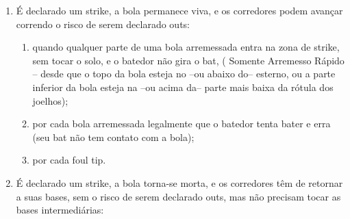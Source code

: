 \begin{multicols}{2}
\begin{enumerate}[label=\alph*)]
		\begin{enumerate}[label=\roman*.]
			\item por cada bola arremessada ilegalmente que n\~ao \'e batida pelo batedor; 
			
			\item quando o t\'ecnico prefere n\~ao aceitar o resultado da jogada depois que a bola \'e batida; ou 
			\item por cada arremesso de aquecimento excedente. 
		\end{enumerate}
		
		\item  \'E declarado um \gls{strike}, a bola permanece viva, e os corredores podem avan\c{c}ar correndo o risco de serem declarado \gls{out}s: 
		
		\begin{enumerate}[label=\roman*.]
			\item quando qualquer parte de uma bola arremessada entra na zona de \gls{strike}, sem tocar o solo, e o batedor n\~ao gira o \gls{bat}, (
			{\color{red!80}Somente Arremesso R\'apido -- desde que o topo da bola esteja no –ou abaixo do– esterno, ou a parte inferior da bola esteja na –ou acima da– parte mais baixa da r\'otula dos joelhos}); 
			\item por cada bola arremessada legalmente que o batedor tenta bater e erra (seu \gls{bat} n\~ao tem contato com a bola); 
			\item  por cada \gls{foul tip}. 
		\end{enumerate}
		\item  \'E declarado um \gls{strike}, a bola torna-se morta, e os corredores t\^em de retornar a suas bases, sem o risco de serem declarado \gls{out}s, mas n\~ao precisam tocar as bases intermedi\'arias: 
		

\end{enumerate}
\end{multicols}
